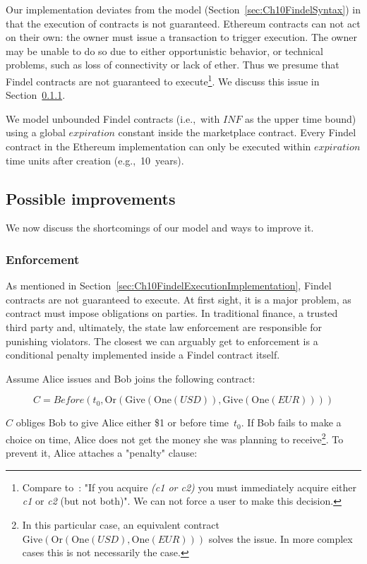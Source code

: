 Our implementation deviates from the model (Section~\ref{sec:Ch10FindelSyntax}) in that the execution of contracts is not guaranteed.
Ethereum contracts can not act on their own: the owner must issue a transaction to trigger execution.
The owner may be unable to do so due to either opportunistic behavior, or technical problems, such as loss of connectivity or lack of ether.
Thus we presume that Findel contracts are not guaranteed to execute\footnote{Compare to~\cite{PeytonJones2000}: "If you acquire \textit{(c1 or c2)} you must immediately acquire either \textit{c1} or \textit{c2} (but not both)". We can not force a user to make this decision.}.
We discuss this issue in Section~\ref{sec:Ch10FindelEnforcement}.

We model unbounded Findel contracts (i.e.,~with $INF$ as the upper time bound) using a global $expiration$ constant inside the marketplace contract.
Every Findel contract in the Ethereum implementation can only be executed within $expiration$ time units after creation (e.g.,~10~years).


\subsection{Possible improvements}

We now discuss the shortcomings of our model and ways to improve it.

\subsubsection{Enforcement} \label{sec:Ch10FindelEnforcement}

As mentioned in Section~\ref{sec:Ch10FindelExecutionImplementation}, Findel contracts are not guaranteed to execute.
At first sight, it is a major problem, as contract must impose obligations on parties.
In traditional finance, a trusted third party and, ultimately, the state law enforcement are responsible for punishing violators.
The closest we can arguably get to enforcement is a conditional penalty implemented inside a Findel contract itself.

Assume Alice issues and Bob joins the following contract:

\[C=Before(t_0,\mathrm{Or}(\mathrm{Give}(\mathrm{One}(USD)),\mathrm{Give}(\mathrm{One}(EUR))))\]

\(C\) obliges Bob to give Alice either \$1 or  before time~$t_0$.
If Bob fails to make a choice on time, Alice does not get the money she was planning to receive\footnote{In this particular case, an equivalent contract \(\mathrm{Give}(\mathrm{Or}(\mathrm{One}(USD),\mathrm{One}(EUR)))\) solves the issue. In more complex cases this is not necessarily the case.}.
To prevent it, Alice attaches a "penalty" clause:

